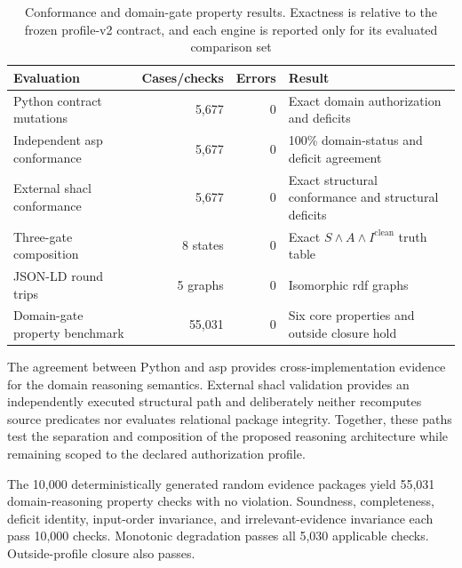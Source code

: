 \documentclass[11pt,a4paper]{article}
\begin{document}
\begin{table}[!htbp]
\centering
\caption{Conformance and domain-gate property results. Exactness is relative to the frozen profile-v2 contract, and each engine is reported only for its evaluated comparison set}
\label{tab:standards-formal-results}
\footnotesize
\renewcommand{\arraystretch}{1.08}
\begin{tabularx}{\textwidth}{@{}p{}r r Y@{}}
\toprule
Evaluation & Cases/checks & Errors & Result \\
\midrule
Python contract mutations & 5,677 & 0 & Exact domain authorization and deficits \\
Independent \ac{asp} conformance & 5,677 & 0 & 100\% domain-status and deficit agreement \\
External \ac{shacl} conformance & 5,677 & 0 & Exact structural conformance and structural deficits \\
Three-gate composition & 8 states & 0 & Exact $S\land A\land I^{\mathrm{clean}}$ truth table \\
JSON-LD round trips & 5 graphs & 0 & Isomorphic \ac{rdf} graphs \\
Domain-gate property benchmark & 55,031 & 0 & Six core properties and outside closure hold \\
\bottomrule
\end{tabularx}
\end{table}




The agreement between Python and \ac{asp} provides cross-implementation
evidence for the domain reasoning semantics. External \ac{shacl} validation
provides an independently executed structural path and deliberately neither
recomputes source predicates nor evaluates relational package integrity.
Together, these paths test the separation and composition of the proposed
reasoning architecture while remaining scoped to the declared authorization
profile.

The 10,000 deterministically generated random evidence packages yield 55,031
domain-reasoning property checks with no violation. Soundness, completeness,
deficit identity, input-order invariance, and irrelevant-evidence invariance
each pass 10,000 checks. Monotonic degradation passes all 5,030 applicable
checks. Outside-profile closure also passes.
\end{document}
